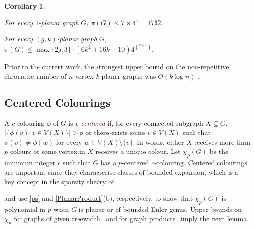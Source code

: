 \documentclass{patmorin}
\theoremstyle{plain}
\newtheorem{cor}[thm]{Corollary}
\theoremstyle{definition}
\newcommand{\defin}[1]{\textcolor{Maroon}{\emph{#1}}}
\newcommand{\note}[2]{\noindent{\color{red}[#1:~#2]}}
\renewcommand{\le}{\leqslant}
\renewcommand{\leq}{\leqslant}
\begin{document}
\begin{cor}\quad
\begin{compactitem}
\item	For every $1$-planar graph $G$, $\pi(G)\le 7\times 4^4=1792$.
\item	For every $(g,k)$-planar graph $G$,
	$  \pi(G)\le \max\{2g,3\}\cdot(6k^2+16k+10) 4^{\binom{k+4}{3}}.$
\end{compactitem}
\end{cor}

Prior to the current work, the strongest upper bound on the non-repetitive chromatic number of $n$-vertex  $k$-planar graphs was $O(k\log n)$ \cite{dujmovic.morin.ea:layered}.

\subsection{Centered Colourings}
\label{centered-colourings}

A $c$-colouring $\phi$ of $G$ is \defin{$p$-centered} if, for every connected subgraph $X\subseteq G$, $|\{\phi(v):v\in V(X)\}| > p$ or there exists some $v\in V(X)$ such that $\phi(v)\neq \phi(w)$ for every $w\in V(X)\setminus\{v\}$.  In words, either $X$ receives more than $p$ colours or some vertex in $X$ receives a unique colour.  Let $\chi_p(G)$ be the minimum integer $c$ such that $G$ has a $p$-centered $c$-colouring. Centered colourings are important since they characterise classes of bounded expansion, which is a key concept in the sparsity theory of \citet{Sparsity}.

\citet{PS21} and \citet{DFMS21} use \cref{ps} and \cref{PlanarProduct}(b), respectively, to show that $\chi_p(G)$ is polynomial in $p$ when $G$ is planar or of bounded Euler genus.
Upper bounds on $\chi_p$ for graphs of given treewidth~\citep{PS21} and for graph products~\citep{DFMS21} imply the next lemma.

\end{document}
